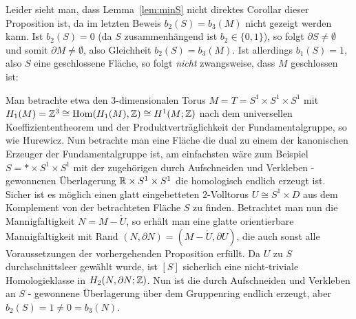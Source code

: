     Leider sieht man, dass Lemma~\ref{lem:minS} nicht direktes Corollar dieser Proposition ist, da im letzten Beweis $b_2(S)=b_3(M)$ nicht gezeigt werden kann. Ist $b_2(S)=0$ (da $S$ zusammenhängend ist $b_2 \in \{0,1\}$), so folgt $\partial S \neq \emptyset$ und somit $\partial M \neq \emptyset$, also Gleichheit $b_2(S)=b_3(M)$. Ist allerdings $b_1(S)=1$, also $S$ eine geschlossene Fläche, so folgt \emph{nicht} zwangsweise, dass $M$ geschlossen ist:
    \begin{bsp}
     Man betrachte etwa den 3-dimensionalen Torus $M=T=S^1\times S^1 \times S^1$ mit $H_1(M)=\mathbb{Z}^3 \cong \operatorname{Hom}(H_1(M),\mathbb{Z}) \cong H^1(M;\mathbb{Z})$ nach dem universellen Koeffiziententheorem und der Produktverträglichkeit der Fundamentalgruppe, so wie Hurewicz. Nun betrachte man eine Fläche die dual zu einem der kanonischen Erzeuger der Fundamentalgruppe ist, am einfachsten wäre zum Beispiel $S=* \times S^1 \times S^1$ mit der zugehörigen durch Aufschneiden und Verkleben -gewonnenen Überlagerung $\mathbb{R} \times S^1 \times S^1$ die homologisch endlich erzeugt ist. Sicher ist es möglich einen glatt eingebetteten $2$-Volltorus $U\cong S^1\times D$ aus dem Komplement von der betrachteten Fläche $S$ zu finden. Betrachtet man nun die Mannigfaltigkeit $N=M - \mathring U$, so erhält man eine glatte orientierbare Mannigfaltigkeit mit Rand $(N,\partial N)= (M- \mathring U, \partial U)$, die auch sonst alle Voraussetzungen der vorhergehenden Proposition erfüllt. Da $U$ zu $S$ durchschnittsleer gewählt wurde, ist $[S]$ sicherlich eine nicht-triviale Homologieklasse in $H_2(N,\partial N;\mathbb{Z})$. Nun ist die durch Aufschneiden und Verkleben an $S$ - gewonnene Überlagerung über dem Gruppenring endlich erzeugt, aber $b_2(S)=1 \neq 0 = b_3(N)$.
    
    \end{bsp}


